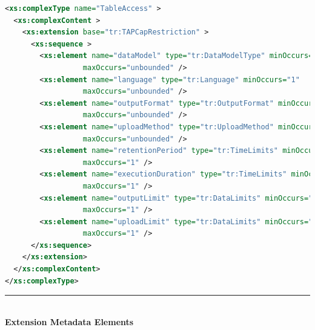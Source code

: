 \documentclass{ivoa}
\begin{document}
\begin{lstlisting}[language=XML]
<xs:complexType name="TableAccess" >
  <xs:complexContent >
    <xs:extension base="tr:TAPCapRestriction" >
      <xs:sequence >
        <xs:element name="dataModel" type="tr:DataModelType" minOccurs="0"
                  maxOccurs="unbounded" />
        <xs:element name="language" type="tr:Language" minOccurs="1"
                  maxOccurs="unbounded" />
        <xs:element name="outputFormat" type="tr:OutputFormat" minOccurs="1"
                  maxOccurs="unbounded" />
        <xs:element name="uploadMethod" type="tr:UploadMethod" minOccurs="0"
                  maxOccurs="unbounded" />
        <xs:element name="retentionPeriod" type="tr:TimeLimits" minOccurs="0"
                  maxOccurs="1" />
        <xs:element name="executionDuration" type="tr:TimeLimits" minOccurs="0"
                  maxOccurs="1" />
        <xs:element name="outputLimit" type="tr:DataLimits" minOccurs="0"
                  maxOccurs="1" />
        <xs:element name="uploadLimit" type="tr:DataLimits" minOccurs="0"
                  maxOccurs="1" />
      </xs:sequence>
    </xs:extension>
  </xs:complexContent>
</xs:complexType>
\end{lstlisting}

\noindent\rule[-2pt]{\textwidth}{0.5pt}\\
					\textbf{ Extension Metadata Elements}
\end{document}
